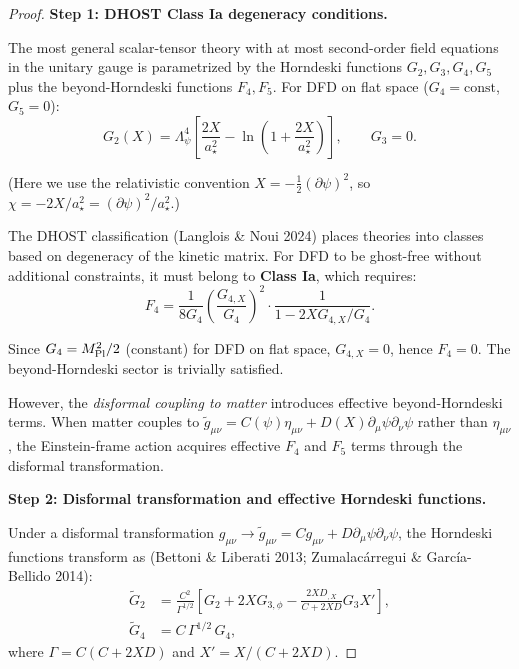 \documentclass[11pt,a4paper]{article}
\begin{document}
\begin{proof}
\textbf{Step 1: DHOST Class Ia degeneracy conditions.}

The most general scalar-tensor theory with at most second-order field equations in the unitary gauge is parametrized by the Horndeski functions $G_2, G_3, G_4, G_5$ plus the beyond-Horndeski functions $F_4, F_5$. For DFD on flat space ($G_4 = \text{const}$, $G_5 = 0$):
\begin{equation}
G_2(X) = \Lambda_\psi^4\left[\frac{2X}{a_\star^2} - \ln\left(1 + \frac{2X}{a_\star^2}\right)\right], \qquad G_3 = 0.
\end{equation}

(Here we use the relativistic convention $X = -\frac{1}{2}(\partial\psi)^2$, so $\chi = -2X/a_\star^2 = (\partial\psi)^2/a_\star^2$.)

The DHOST classification (Langlois \& Noui 2024) places theories into classes based on degeneracy of the kinetic matrix. For DFD to be ghost-free without additional constraints, it must belong to \textbf{Class Ia}, which requires:
\begin{equation}\label{eq:class-Ia}
F_4 = \frac{1}{8G_4}\left(\frac{G_{4,X}}{G_4}\right)^2 \cdot \frac{1}{1 - 2XG_{4,X}/G_4}.
\end{equation}

Since $G_4 = M_{\rm Pl}^2/2$ (constant) for DFD on flat space, $G_{4,X} = 0$, hence $F_4 = 0$. The beyond-Horndeski sector is trivially satisfied.

However, the \emph{disformal coupling to matter} introduces effective beyond-Horndeski terms. When matter couples to $\tilde{g}_{\mu\nu} = C(\psi)\eta_{\mu\nu} + D(X)\partial_\mu\psi\partial_\nu\psi$ rather than $\eta_{\mu\nu}$, the Einstein-frame action acquires effective $F_4$ and $F_5$ terms through the disformal transformation.

\textbf{Step 2: Disformal transformation and effective Horndeski functions.}

Under a disformal transformation $g_{\mu\nu} \to \tilde{g}_{\mu\nu} = Cg_{\mu\nu} + D\partial_\mu\psi\partial_\nu\psi$, the Horndeski functions transform as (Bettoni \& Liberati 2013; Zumalac\'arregui \& Garc\'ia-Bellido 2014):
\begin{align}
\tilde{G}_2 &= \frac{C^2}{\Gamma^{1/2}}\left[G_2 + 2XG_{3,\phi} - \frac{2X D_{,X}}{C+2XD}G_3 X'\right], \\
\tilde{G}_4 &= C\,\Gamma^{1/2}\,G_4,
\end{align}
where $\Gamma = C(C + 2XD)$ and $X' = X/(C+2XD)$.


\end{proof}
\end{document}
